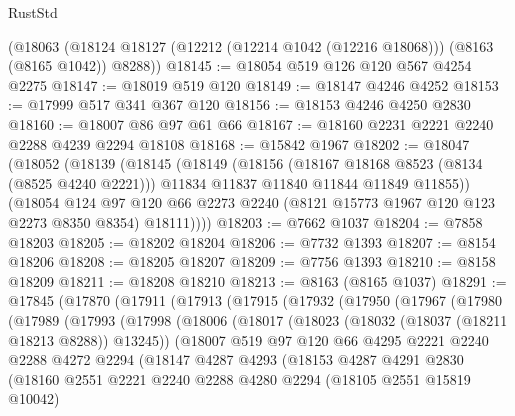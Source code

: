 \begin{lexlean}{RustStd}
\begin{coremodule}
{\begin{coremodule}
{{{{{{{{{{{{{{{{{{{{{{{{{{{{{{{{{{{{{{{{{{{{{{{{{{{{{    (@18063 (@18124 @18127 (@12212 (@12214 @1042 (@12216 @18068))) (@8163 (@8165 @1042)) @8288))
@18145 := @18054 @519 @126 @120 @567 @4254 @2275
@18147 := @18019 @519 @120
@18149 := @18147 @4246 @4252
@18153 := @17999 @517 @341 @367 @120
@18156 := @18153 @4246 @4250 @2830
@18160 := @18007 @86 @97 @61 @66
@18167 := @18160 @2231 @2221 @2240 @2288 @4239 @2294 @18108
@18168 := @15842 @1967
@18202 := @18047
    (@18052
      (@18139
        (@18145
          (@18149
            (@18156
              (@18167 @18168 @8523 (@8134 (@8525 @4240 @2221)))
              @11834
              @11837
              @11840
              @11844
              @11849
              @11855))
          (@18054
            @124
            @97
            @120
            @66
            @2273
            @2240
            (@8121 @15773 @1967 @120 @123 @2273 @8350 @8354)
            @18111))))
@18203 := @7662 @1037
@18204 := @7858 @18203
@18205 := @18202 @18204
@18206 := @7732 @1393
@18207 := @8154 @18206
@18208 := @18205 @18207
@18209 := @7756 @1393
@18210 := @8158 @18209
@18211 := @18208 @18210
@18213 := @8163 (@8165 @1037)
@18291 := @17845
    (@17870
      (@17911
        (@17913
          (@17915
            (@17932
              (@17950
                (@17967
                  (@17980
                    (@17989
                      (@17993
                        (@17998
                          (@18006
                            (@18017
                              (@18023 (@18032 (@18037 (@18211 @18213 @8288)) @13245))
                              (@18007
                                @519
                                @97
                                @120
                                @66
                                @4295
                                @2221
                                @2240
                                @2288
                                @4272
                                @2294
                                (@18147
                                  @4287
                                  @4293
                                  (@18153
                                    @4287
                                    @4291
                                    @2830
                                    (@18160
                                      @2551
                                      @2221
                                      @2240
                                      @2288
                                      @4280
                                      @2294
                                      (@18105 @2551 @15819 @10042)
}}}}}}}}}}}}}}}}}}}}}}}}}}}}}}}}}}}}}}}}}}}}}}}}}}}}}
\end{coremodule}}
\end{coremodule}
\end{lexlean}
